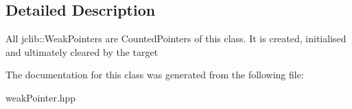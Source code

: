 \subsection{Detailed Description}
All jclib\+::\+Weak\+Pointers are Counted\+Pointers of this class. It is created, initialised and ultimately cleared by the target 

The documentation for this class was generated from the following file\+:\begin{DoxyCompactItemize}
\item 
weak\+Pointer.\+hpp\end{DoxyCompactItemize}
